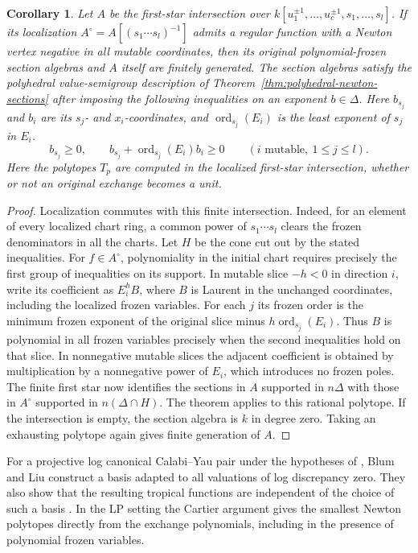 \documentclass[11pt,reqno]{amsart}
\numberwithin{equation}{section}
\newtheorem{corollary}[theorem]{Corollary}
\theoremstyle{definition}
\theoremstyle{remark}
\begin{document}
\begin{corollary}\label{cor:polynomial-polyhedral-newton-sections}
Let \(A\) be the first-star intersection over
\(k[u_1^{\pm1},\ldots,u_c^{\pm1},s_1,\ldots,s_l]\). If its
localization \(A^\circ=A[(s_1\cdots s_l)^{-1}]\) admits a regular
function with a Newton vertex negative in all mutable coordinates,
then its original polynomial-frozen section algebras and \(A\)
itself are finitely generated. The section algebras satisfy the
polyhedral value-semigroup description of
Theorem~\ref{thm:polyhedral-newton-sections} after imposing the
following inequalities on an exponent \(b\in\Delta\). Here \(b_{s_j}\)
and \(b_i\) are its \(s_j\)- and \(x_i\)-coordinates, and
\(\operatorname{ord}_{s_j}(E_i)\) is the least exponent of \(s_j\)
in \(E_i\).
\[ b_{s_j}\ge0,\qquad b_{s_j}+\operatorname{ord}_{s_j}(E_i)b_i\ge0 \qquad(i\text{ mutable},\ 1\le j\le l). \]
Here the polytopes \(T_p\) are computed in the localized first-star
intersection, whether or not an original exchange becomes a unit.
\end{corollary}
\begin{proof}
Localization commutes with this finite intersection. Indeed, for
an element of every localized chart ring, a common power of
\(s_1\cdots s_l\) clears the frozen denominators in all the charts.
Let \(H\) be the cone cut out by the stated inequalities.
For \(f\in A^\circ\), polynomiality in the initial chart
requires precisely the first group of inequalities on its support.
In mutable slice \(-h<0\) in direction \(i\), write its coefficient
as \(E_i^h B\), where \(B\) is Laurent in the unchanged
coordinates, including the localized frozen variables. For each
\(j\) its frozen order is the minimum frozen exponent of the
original slice minus \(h\operatorname{ord}_{s_j}(E_i)\).
Thus \(B\) is polynomial in all frozen variables precisely when
the second inequalities hold on that slice. In nonnegative mutable
slices the adjacent coefficient is obtained by multiplication by
a nonnegative power of \(E_i\), which introduces no frozen
poles. The finite first star now identifies the sections in \(A\)
supported in \(n\Delta\) with those in \(A^\circ\) supported in
\(n(\Delta\cap H)\). The theorem applies to this rational polytope.
If the intersection is empty, the section algebra is \(k\) in
degree zero. Taking an exhausting polytope again gives finite
generation of \(A\).
\end{proof}

For a projective log canonical Calabi--Yau pair under the hypotheses
of \cite[Theorem~1.2]{BL}, Blum and Liu construct a basis adapted to
all valuations of log discrepancy zero. They also show that the
resulting tropical functions are independent of the choice of such a
basis \cite[Lemma~3.20]{BL}. In the LP setting the Cartier argument
gives the smallest Newton polytopes directly from the exchange
polynomials, including in the presence of polynomial frozen variables.
\end{document}
